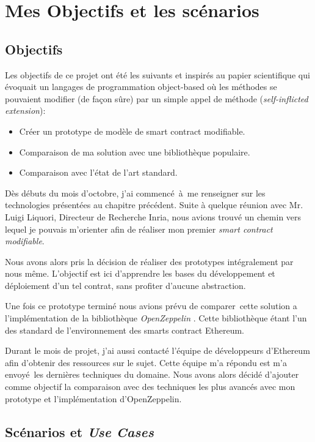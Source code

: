 \section{Mes Objectifs et les scénarios}

\subsection{Objectifs}

Les objectifs de ce projet ont été les suivants et inspirés au papier scientifique \cite{OOPSLA} qui évoquait un langages de programmation object-based où les méthodes se pouvaient modifier (de façon sûre) par un simple appel de méthode (\emph{self-inflicted extension}):

\begin{itemize}
    \item Créer un prototype de modèle de smart contract modifiable.
    \item Comparaison de ma solution avec une bibliothèque populaire.
    \item Comparaison avec l'état de l'art standard.
\end{itemize}

Dès débuts du mois d'octobre, j'ai commencé à me renseigner sur les technologies présentées au chapitre
précédent. Suite à quelque réunion avec Mr. Luigi Liquori, Directeur de Recherche Inria, nous avions trouvé un chemin vers lequel je pouvais m'orienter afin de réaliser mon premier \emph{smart contract modifiable}.

Nous avons alors pris la décision de réaliser des prototypes intégralement par nous même.
L'objectif est ici d'apprendre les bases du développement et déploiement d'un tel contrat,
sans profiter d'aucune abstraction.

Une fois ce prototype terminé nous avions prévu de comparer cette solution a l'implémentation
de la bibliothèque \emph{OpenZeppelin} \cite{OpenZeppelin}. Cette bibliothèque étant l'un des standard de l'environnement
des smarts contract Ethereum.

Durant le mois de projet, j'ai aussi contacté l'équipe de développeurs d'Ethereum afin d'obtenir
des ressources sur le sujet. Cette équipe m'a répondu est m'a envoyé les dernières techniques du
domaine. Nous avons alors décidé d'ajouter comme objectif la comparaison avec des techniques les
plus avancés avec mon prototype et l'implémentation d'OpenZeppelin.

\subsection{Scénarios et \emph{Use Cases}}

